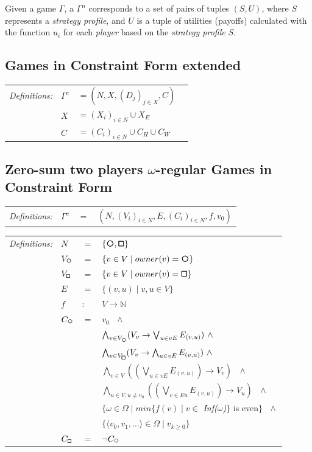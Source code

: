\documentclass[12pt]{extarticle}
\newcommand{\definition}[1] {
    \begin{tcolorbox}[colback=mygray,colframe=mygray,sharp corners=all,top=0.01cm,bottom=0.01cm,left=0.1cm]
    \small
    \setlength{\tabcolsep}{2pt}
    \begin{tabular}{l l l l}
        \textit{Definitions:} & #1
    \end{tabular}
    \end{tcolorbox}
}
\begin{document}
Given a game $\Gamma$, a $\Gamma^n$ corresponds to a set of pairs of tuples $(S, U)$, where $S$ represents a \textit{strategy profile}, and $U$ is a tuple of utilities (payoffs) calculated with the function $u_i$ for each \textit{player} based on the \textit{strategy profile} $S$.

\subsection{Games in Constraint Form extended}

\definition{
    $\Gamma^c$ &$= (N,X,(D_j)_{j \in X}, C) $
    \\ & $X $&$ = (X_i)_{i \in N} \cup X_{E} $
    \\ & $C $&$ = (C_i)_{i \in N} \cup C_{H} \cup C_W$
}

\subsection{Zero-sum two players $\omega$-regular Games in Constraint Form}


\definition{
    $\Gamma^c$ & $ = $&$ (N,(V_i)_{i \in N},E,(C_i)_{i \in N},\textit{f},v_0) $
}
\definition{
    $N$ & $ = $&$ \{\even,\odd\}$
    \\ & $V_{\subeven}$ & $ = $&$ \{v \in V \mid owner(v) = \even\}$
    \\ & $V_{\subodd}$ & $ = $&$ \{v \in V \mid owner(v) = \odd\}$
    \\ & $E$ & $ = $&$ \{(v,u) \mid v, u \in V\}$
    \\ & $f$ & $ : $&$ V \rightarrow \mathbb{N} $
    \\ & $C_{\subeven}$ & $ = $&$ v_0 \textit{ } \wedge $
    \\ & & & $ \bigwedge_{v \in V_{\subeven}} (V_v \rightarrow \bigvee_{u \in vE} E_{(v,u)}) \textit{ } \wedge $
    \\ & & & $ \bigwedge_{v \in V_{\subodd}} (V_v \rightarrow \bigwedge_{u \in vE} E_{(v,u)}) \textit{ } \wedge $
    \\ & & & $ \bigwedge_{v \in V} ((\bigvee_{u \in vE} E_{(v,u)}) \rightarrow V_v) \textit{ } \wedge $
    \\ & & & $ \bigwedge_{u \in V, u \neq v_0} ((\bigvee_{v \in Eu} E_{(v,u)}) \rightarrow V_u) \textit{ } \wedge $
    \\ & & & $ \{ \omega \in \Omega \mid min\{f(v) \mid v \in $ \textit{Inf($\omega$)}$\}$ is even$\} \textit{ } \wedge $
    \\ & & & $ \{\langle v_0,v_1,\ldots \rangle \in \Omega \mid v_{k \geqslant 0}\}$
    \\ & $C_{\subodd}$ & $ = $&$ \neg C_{\subeven}$
}
\end{document}
